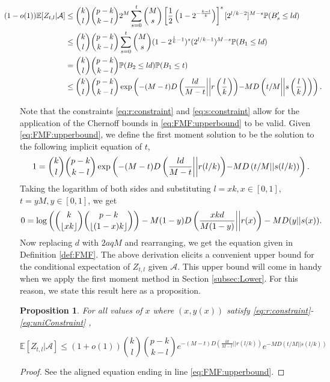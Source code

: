 \documentclass[12pt,reqno]{amsart}
\numberwithin{equation}{section}
\newtheorem{proposition}[theorem]{Proposition}
\theoremstyle{definition}
\newcommand{\E}{\mathbb{E}}
\newcommand{\floor}[1]{\left\lfloor #1 \right\rfloor}
\renewcommand{\P}{\mathbb{P}}
\renewcommand{\[}{\begin{equation}}
\renewcommand{\]}{\end{equation}}
\newcommand{\scr}{\mathcal}
\renewcommand{\|}{\bigg{|}}
\newcommand{\const}{\eqref{eq:r:constraint}-\eqref{eq:uniConstraint} }
\begin{document}
\begin{align}
	\hspace{-0.75cm}(1-o(1))\E[Z_{t,l}|\scr{A}] &\leq  \binom{k}{l} \binom{p - k}{k-l} 2^M \sum_{s = 0}^t\binom{M}{s}\left[\frac{1}{2}\left(1-2^{-\frac{k-l}{k}}\right)\right]^s [2^{l/k - 2}]^{M-s}\P(B'_s \leq ld)\\
	&\leq  \binom{k}{l} \binom{p - k}{k-l}\sum_{s = 0}^t\binom{M}{s}(1-2^{\frac{l}{k}-1})^s (2^{l/k - 1})^{M-s}\P(B_1 \leq ld)\label{eq:stocDom}\\
	&=  \binom{k}{l} \binom{p - k}{k-l} \P(B_2 \leq ld) \P(B_1\leq t)\\
	&\leq \binom{k}{l} \binom{p - k}{k-l} \exp\left({-(M-t)D\left(\frac{ld}{M-t}\|\|r\left(\frac{l}{k} \right)\right)} {-MD\left(t/M\|\|s\left(\frac{l}{k}\right)\right)}\right).\label{eq:FMF:upperbound}
\end{align}

Note that the constraints \eqref{eq:r:constraint} and \eqref{eq:s:constraint} allow for the application of the Chernoff bounds in \eqref{eq:FMF:upperbound} to be valid. Given \eqref{eq:FMF:upperbound}, we define the first moment solution to be the solution to the following implicit equation of $t$,
\begin{equation}
    1 = \binom{k}{l} \binom{p - k}{k-l} \exp\left({-(M-t)D\left(\frac{ld}{M-t}\|\|r(l/k)\right)} {-MD\left(t/M||s(l/k)\right)}\right).
\end{equation}
Taking the logarithm of both sides and substituting $l = xk, x \in [0,1]$, $t = yM, y \in [0,1]$, we get
\[0 = \log\left(\binom{k}{\floor{xk}} \binom{p - k}{\floor{(1-x)k}}\right) - M(1-y)D\left(\frac{xkd}{M(1-y)}\|\|r(x)\right) - MD(y||s(x)).\]
Now replacing $d$ with $2aqM$ and rearranging, we get the equation given in Definition \ref{def:FMF}. The above derivation elicits a convenient upper bound for the conditional expectation of $Z_{t,l}$ given $\scr{A}$. This upper bound will come in handy when we apply the first moment method in Section \ref{subsec:Lower}. For this reason, we state this result here as a proposition.

\begin{proposition}\label{cor:upperBound}
    For all values of $x$ where $(x,y(x))$ satisfy \const\!, 

    \[\E[Z_{t,l}|\scr{A}] \leq (1+o(1))\binom{k}{l} \binom{p - k}{k-l} e^{-(M-t)D(\frac{ld}{M-t}||r(l/k))} e^{-MD(t/M||s(l/k))}\]
\end{proposition}

\begin{proof}
    See the aligned equation ending in line \eqref{eq:FMF:upperbound}.
\end{proof}
\end{document}
